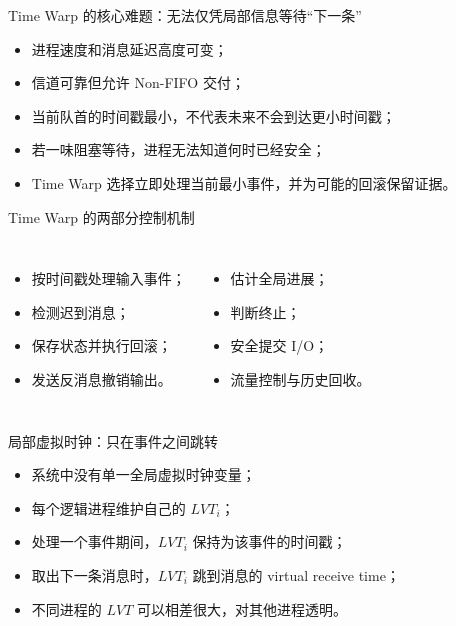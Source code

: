 \documentclass[UTF8,fontset=none,aspectratio=169,10pt]{beamer}
\begin{document}
\begin{frame}{Time Warp 的核心难题：无法仅凭局部信息等待“下一条”}
\begin{itemize}
  \item 进程速度和消息延迟高度可变；
  \item 信道可靠但允许 Non-FIFO 交付；
  \item 当前队首的时间戳最小，不代表未来不会到达更小时间戳；
  \item 若一味阻塞等待，进程无法知道何时已经安全；
  \item Time Warp 选择立即处理当前最小事件，并为可能的回滚保留证据。
\end{itemize}
\end{frame}

\begin{frame}{Time Warp 的两部分控制机制}
\begin{columns}[T,onlytextwidth]
\begin{itemize}
  \item 按时间戳处理输入事件；
  \item 检测迟到消息；
  \item 保存状态并执行回滚；
  \item 发送反消息撤销输出。
\end{itemize}
\begin{itemize}
  \item 估计全局进展；
  \item 判断终止；
  \item 安全提交 I/O；
  \item 流量控制与历史回收。
\end{itemize}
\end{columns}
\end{frame}

\begin{frame}{局部虚拟时钟：只在事件之间跳转}
\begin{itemize}
  \item 系统中没有单一全局虚拟时钟变量；
  \item 每个逻辑进程维护自己的 $LVT_i$；
  \item 处理一个事件期间，$LVT_i$ 保持为该事件的时间戳；
  \item 取出下一条消息时，$LVT_i$ 跳到消息的 virtual receive time；
  \item 不同进程的 $LVT$ 可以相差很大，对其他进程透明。
\end{itemize}
\end{frame}
\end{document}
